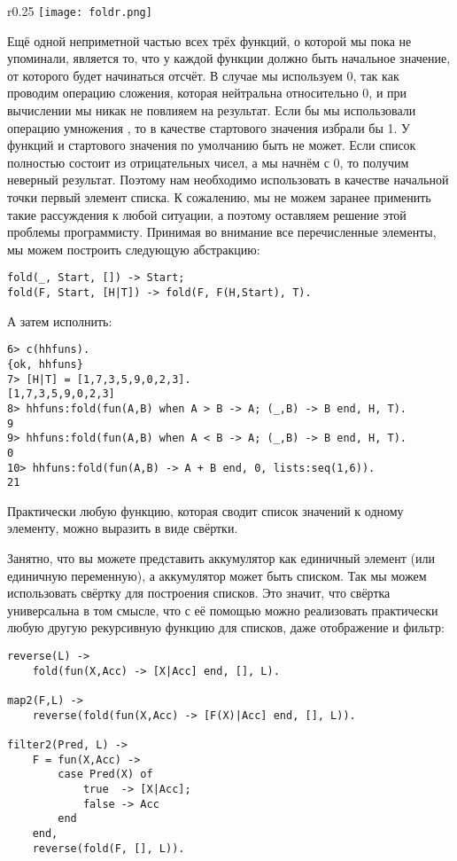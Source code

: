 \begin{wrapfigure}{r}{0.25\linewidth}
    \texttt{[image: foldr.png]}
\end{wrapfigure}
Ещё одной неприметной частью всех трёх функций, о которой мы пока не упоминали, является то, что у каждой функции должно быть начальное значение, от которого будет начинаться отсчёт.
В случае  мы используем 0, так как проводим операцию сложения, которая нейтральна относительно 0, и при вычислении  мы никак не повлияем на результат.
Если бы мы использовали операцию умножения , то в качестве стартового значения избрали бы 1.
У функций  и  стартового значения по умолчанию быть не может.
Если список полностью состоит из отрицательных чисел, а мы начнём с 0, то получим неверный результат.
Поэтому нам необходимо использовать в качестве начальной точки первый элемент списка.
К сожалению, мы не можем заранее применить такие рассуждения к любой ситуации, а поэтому оставляем решение этой проблемы программисту.
Принимая во внимание все перечисленные элементы, мы можем построить следующую абстракцию:
\begin{lstlisting}[style=erlang]
fold(_, Start, []) -> Start;
fold(F, Start, [H|T]) -> fold(F, F(H,Start), T).
\end{lstlisting}
А затем исполнить:
\begin{lstlisting}[style=erlang]
6> c(hhfuns).
{ok, hhfuns}
7> [H|T] = [1,7,3,5,9,0,2,3].   
[1,7,3,5,9,0,2,3]
8> hhfuns:fold(fun(A,B) when A > B -> A; (_,B) -> B end, H, T).
9
9> hhfuns:fold(fun(A,B) when A < B -> A; (_,B) -> B end, H, T).
0
10> hhfuns:fold(fun(A,B) -> A + B end, 0, lists:seq(1,6)).
21
\end{lstlisting}

Практически любую функцию, которая сводит список значений к одному элементу, можно выразить в виде свёртки.

Занятно, что вы можете представить аккумулятор как единичный элемент (или единичную переменную), а аккумулятор может быть списком.
Так мы можем использовать свёртку для построения списков.
Это значит, что свёртка универсальна в том смысле, что с её помощью можно реализовать практически любую другую рекурсивную функцию для списков, даже отображение и фильтр:
\begin{lstlisting}[style=erlang]
reverse(L) ->
    fold(fun(X,Acc) -> [X|Acc] end, [], L).
 
map2(F,L) ->
    reverse(fold(fun(X,Acc) -> [F(X)|Acc] end, [], L)).
 
filter2(Pred, L) ->
    F = fun(X,Acc) ->
        case Pred(X) of
            true  -> [X|Acc];
            false -> Acc
        end
    end,
    reverse(fold(F, [], L)).
\end{lstlisting}


